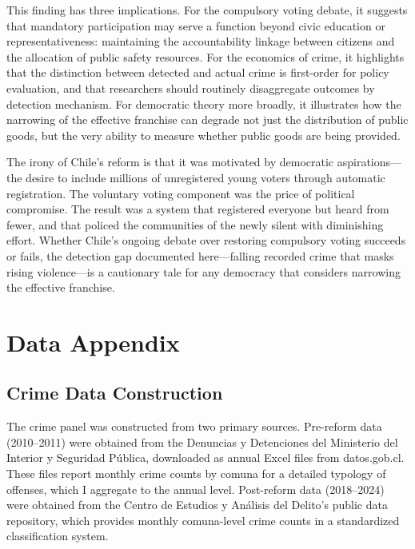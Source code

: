 \documentclass[12pt]{article}
\begin{document}
This finding has three implications. For the compulsory voting debate, it suggests that mandatory participation may serve a function beyond civic education or representativeness: maintaining the accountability linkage between citizens and the allocation of public safety resources. For the economics of crime, it highlights that the distinction between detected and actual crime is first-order for policy evaluation, and that researchers should routinely disaggregate outcomes by detection mechanism. For democratic theory more broadly, it illustrates how the narrowing of the effective franchise can degrade not just the distribution of public goods, but the very ability to measure whether public goods are being provided.

The irony of Chile's reform is that it was motivated by democratic aspirations---the desire to include millions of unregistered young voters through automatic registration. The voluntary voting component was the price of political compromise. The result was a system that registered everyone but heard from fewer, and that policed the communities of the newly silent with diminishing effort. Whether Chile's ongoing debate over restoring compulsory voting succeeds or fails, the detection gap documented here---falling recorded crime that masks rising violence---is a cautionary tale for any democracy that considers narrowing the effective franchise.

\label{apep_main_text_end}



\clearpage
\appendix
\renewcommand{\thesection}{\Alph{section}}
\renewcommand{\thetable}{\Alph{section}\arabic{table}}
\renewcommand{\thefigure}{\Alph{section}\arabic{figure}}
\setcounter{table}{0}
\setcounter{figure}{0}

\section{Data Appendix}\label{app:data}

\subsection{Crime Data Construction}

The crime panel was constructed from two primary sources. Pre-reform data (2010--2011) were obtained from the Denuncias y Detenciones del Ministerio del Interior y Seguridad P\'{u}blica, downloaded as annual Excel files from datos.gob.cl. These files report monthly crime counts by comuna for a detailed typology of offenses, which I aggregate to the annual level. Post-reform data (2018--2024) were obtained from the Centro de Estudios y An\'{a}lisis del Delito's public data repository, which provides monthly comuna-level crime counts in a standardized classification system.
\end{document}
